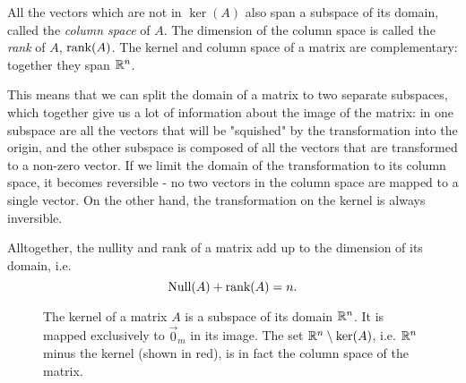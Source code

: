 All the vectors which are not in $\ker(A)$ also span a subspace of its domain, called the \emph{column space} of $A$. The dimension of the column space is called the \emph{rank} of $A$, $\text{rank}(A)$. The kernel and column space of a matrix are complementary: together they span $\mathbb{R}^{n}$.

This means that we can split the domain of a matrix to two separate subspaces, which together give us a lot of information about the image of the matrix: in one subspace are all the vectors that will be "squished" by the transformation into the origin, and the other subspace is composed of all the vectors that are transformed to a non-zero vector. If we limit the domain of the transformation to its column space, it becomes reversible - no two vectors in the column space are mapped to a single vector. On the other hand, the transformation on the kernel is always inversible.

Alltogether, the nullity and rank of a matrix add up to the dimension of its domain, i.e.
\begin{equation}
	\text{Null}(A) + \text{rank}(A) = n.
	\label{eq:}
\end{equation}

\begin{figure}[]
	\centering
	\caption{The kernel of a matrix $A$ is a subspace of its domain $\mathbb{R}^{n}$. It is mapped exclusively to $\vec{0}_{m}$ in its image. The set $\mathbb{R}^{n}\setminus\ker(A)$, i.e. $\mathbb{R}^{n}$ minus the kernel (shown in red), is in fact the column space of the matrix.}
	\label{fig:kernel_subspace}
\end{figure}

